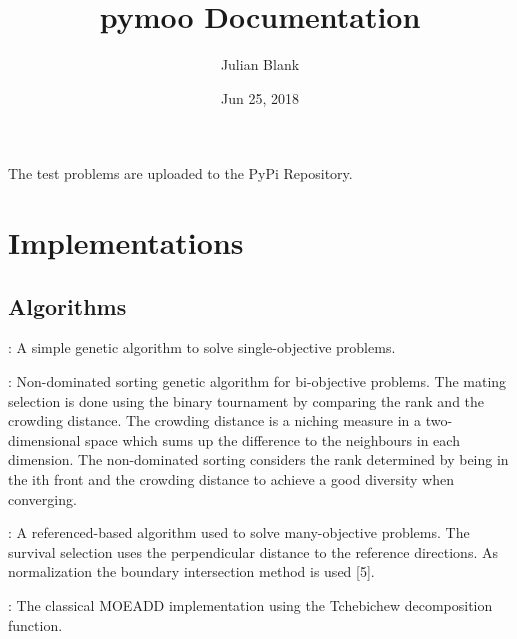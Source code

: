 \documentclass[letterpaper,10pt,english]{sphinxhowto}
\title{pymoo Documentation}
\date{Jun 25, 2018}
\author{Julian Blank}
\begin{document}
\maketitle
\sphinxtableofcontents
{}\label{\detokenize{index::doc}}


The test problems are uploaded to the PyPi Repository.

%
\begin{sphinxVerbatim}[commandchars=\\\{\}]
  
\end{sphinxVerbatim}


\section{Implementations}
\label{\detokenize{index:implementations}}\label{\detokenize{index:installation}}

\subsection{Algorithms}
\label{\detokenize{index:algorithms}}
: A simple genetic algorithm to solve
single-objective problems.

 \label{\detokenize{index:id1}}{\hyperref[\detokenize{index:deb-2002-fem-2221359-2221582}]{\sphinxcrossref{{[}1{]}}}}: Non-dominated sorting genetic algorithm for
bi-objective problems. The mating selection is done using the binary
tournament by comparing the rank and the crowding distance. The crowding
distance is a niching measure in a two-dimensional space which sums up
the difference to the neighbours in each dimension. The non-dominated
sorting considers the rank determined by being in the ith front and the
crowding distance to achieve a good diversity when converging.

 \label{\detokenize{index:id2}}{\hyperref[\detokenize{index:nsgaiii}]{\sphinxcrossref{{[}2{]}}}} \label{\detokenize{index:id3}}{\hyperref[\detokenize{index:nsgaiii-part2}]{\sphinxcrossref{{[}3{]}}}}: A referenced-based algorithm used to solve
many-objective problems. The survival selection uses the perpendicular
distance to the reference directions. As normalization the boundary
intersection method is used {[}5{]}.

 \label{\detokenize{index:id4}}{\hyperref[\detokenize{index:zhang07amulti-objective}]{\sphinxcrossref{{[}4{]}}}}: The classical MOEADD implementation using the
Tchebichew decomposition function.
\end{document}
